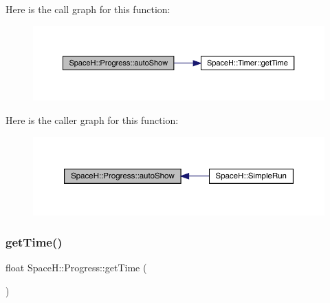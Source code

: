 Here is the call graph for this function\+:
\nopagebreak
\begin{figure}[H]
\begin{center}
\leavevmode
\includegraphics[width=350pt]{class_space_h_1_1_progress_ad194086720a65396b774f1609917ef93_cgraph}
\end{center}
\end{figure}
Here is the caller graph for this function\+:
\nopagebreak
\begin{figure}[H]
\begin{center}
\leavevmode
\includegraphics[width=350pt]{class_space_h_1_1_progress_ad194086720a65396b774f1609917ef93_icgraph}
\end{center}
\end{figure}
\mbox{\label{class_space_h_1_1_progress_a65de623956f06ddf7b587dd248916dff}} 
\subsubsection{\texorpdfstring{get\+Time()}{getTime()}}
{\footnotesize\ttfamily float Space\+H\+::\+Progress\+::get\+Time (\begin{DoxyParamCaption}{ }\end{DoxyParamCaption})\hspace{0.3cm}{\ttfamily [inline]}}

